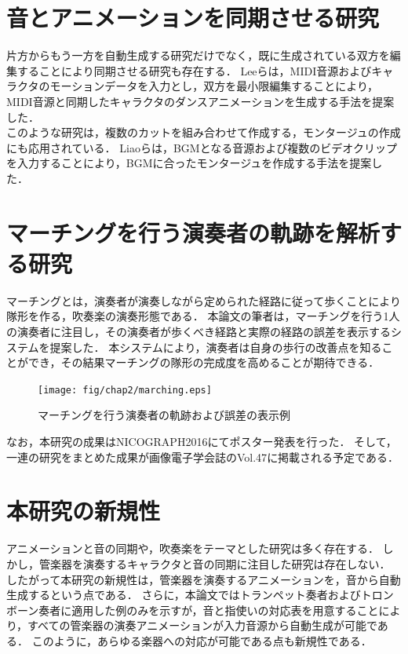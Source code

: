 \section{音とアニメーションを同期させる研究} \label{sec:synchronization}
片方からもう一方を自動生成する研究だけでなく，既に生成されている双方を編集することにより同期させる研究も存在する．
Leeら\cite{Lee}は，MIDI音源およびキャラクタのモーションデータを入力とし，双方を最小限編集することにより，MIDI音源と同期したキャラクタのダンスアニメーションを生成する手法を提案した．\\
\indent
このような研究は，複数のカットを組み合わせて作成する，モンタージュの作成にも応用されている．
Liaoら\cite{Liao}は，BGMとなる音源および複数のビデオクリップを入力することにより，BGMに合ったモンタージュを作成する手法を提案した．

\section{マーチングを行う演奏者の軌跡を解析する研究} \label{sec:marching}
マーチングとは，演奏者が演奏しながら定められた経路に従って歩くことにより隊形を作る，吹奏楽の演奏形態である．
本論文の筆者は，マーチングを行う1人の演奏者に注目し，その演奏者が歩くべき経路と実際の経路の誤差を表示するシステムを提案した．
本システムにより，演奏者は自身の歩行の改善点を知ることができ，その結果マーチングの隊形の完成度を高めることが期待できる．
\begin{figure}[h]
	\centering
	\texttt{[image: fig/chap2/marching.eps]}
	\caption{マーチングを行う演奏者の軌跡および誤差の表示例}
	\label{fig:marching}
\end{figure}
なお，本研究の成果はNICOGRAPH2016にてポスター発表\cite{NICOGRAPH}を行った．
そして，一連の研究をまとめた成果が画像電子学会誌のVol.47\cite{iieej}に掲載される予定である．

\section{本研究の新規性}\label{sec:compere}
アニメーションと音の同期や，吹奏楽をテーマとした研究は多く存在する．
しかし，管楽器を演奏するキャラクタと音の同期に注目した研究は存在しない．
したがって本研究の新規性は，管楽器を演奏するアニメーションを，音から自動生成するという点である．
さらに，本論文ではトランペット奏者およびトロンボーン奏者に適用した例のみを示すが，音と指使いの対応表を用意することにより，すべての管楽器の演奏アニメーションが入力音源から自動生成が可能である．
このように，あらゆる楽器への対応が可能である点も新規性である．